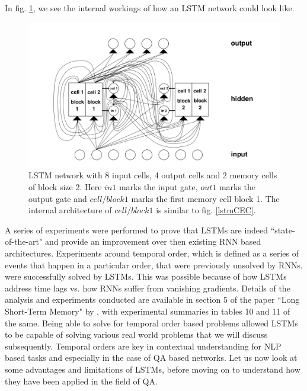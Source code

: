 \documentclass[a4paper,12pt]{report}
\begin{document}
            In fig. \ref{lstmNetwork}, we see the internal workings of how an LSTM network could look like.
            \begin{figure}[!h]
	           \centering
               \includegraphics[scale=0.35]{../images/lstm-network.png}
      		   \caption{LSTM network with 8 input cells, 4 output cells and 2 memory cells of block size 2. Here $ in1 $ marks the input gate, $ out1 $ marks the output gate and $ cell/block1 $ marks the first memory cell block 1. The internal architecture of $ cell/block1 $ is similar to fig. \ref{lstmCEC}. \citep{lstmoriginal}}\label{lstmNetwork}
            \end{figure}

            A series of experiments were performed to prove that LSTMs are indeed ``state-of-the-art" and provide an improvement over then existing RNN based architectures.
            Experiments around temporal order, which is defined as a series of events that happen in a particular order, that were previously unsolved by RNNs, were successfully solved by LSTMs. This was possible because of how LSTMs address time lags vs. how RNNs suffer from vanishing gradients. Details of the analysis and experiments conducted are available in section 5 of the paper ``Long Short-Term Memory" by \cite{lstmoriginal}, with experimental summaries in tables 10 and 11 of the same. Being able to solve for temporal order based problems allowed LSTMs to be capable of solving various real world problems that we will discuss subsequently.
            Temporal orders are key in contextual understanding for NLP based tasks and especially in the case of QA based networks. Let us now look at some advantages and limitations of LSTMs, before moving on to understand how they have been applied in the field of QA.
\end{document}
